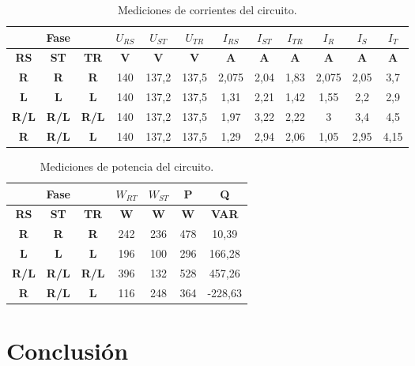 \documentclass[a4paper]{article}
\begin{document}
\begin{table}[H]
\centering
\begin{tabular}{|c|c|c|c|c|c|c|c|c|c|c|c|}
\hline
\multicolumn{3}{|c|}{\textbf{Fase}} & \textbf{$U_{RS}$} & \textbf{$U_{ST}$} & \textbf{$U_{TR}$} & \textbf{$I_{RS}$} & \textbf{$I_{ST}$} & \textbf{$I_{TR}$} & \textbf{$I_{R}$} & \textbf{$I_{S}$} & \textbf{$I_{T}$} \\ \hline
\textbf{RS} & \textbf{ST} & \textbf{TR} & \textbf{V} & \textbf{V} & \textbf{V} & \textbf{A} & \textbf{A} & \textbf{A} & \textbf{A} & \textbf{A} & \textbf{A} \\ \hline
\textbf{R} & \textbf{R} & \textbf{R} & 140 & 137,2 & 137,5 & 2,075 & 2,04 & 1,83 & 2,075 & 2,05 & 3,7 \\ \hline
\textbf{L} & \textbf{L} & \textbf{L} & 140 & 137,2 & 137,5 & 1,31 & 2,21 & 1,42 & 1,55 & 2,2 & 2,9 \\ \hline
\textbf{R/L} & \textbf{R/L} & \textbf{R/L} & 140 & 137,2 & 137,5 & 1,97 & 3,22 & 2,22 & 3 & 3,4 & 4,5 \\ \hline
\textbf{R} & \textbf{R/L} & \textbf{L} & 140 & 137,2 & 137,5 & 1,29 & 2,94 & 2,06 & 1,05 & 2,95 & 4,15 \\ \hline
\end{tabular}
\label{tabla:1}
\caption{Mediciones de corrientes del circuito.}
\end{table}

\begin{table}[H]
\centering
\begin{tabular}{|c|c|c|c|c|c|c|}
\hline
\multicolumn{3}{|c|}{\textbf{Fase}} & \textbf{$W_{RT}$} & \textbf{$W_{ST}$} & \textbf{P} & \textbf{Q} \\ \hline
\textbf{RS} & \textbf{ST} & \textbf{TR} & \textbf{W} & \textbf{W} & \textbf{W} & \textbf{VAR} \\ \hline
\textbf{R} & \textbf{R} & \textbf{R} & 242 & 236 & 478 & 10,39 \\ \hline
\textbf{L} & \textbf{L} & \textbf{L} & 196 & 100 & 296 & 166,28 \\ \hline
\textbf{R/L} & \textbf{R/L} & \textbf{R/L} & 396 & 132 & 528 & 457,26 \\ \hline
\textbf{R} & \textbf{R/L} & \textbf{L} & 116 & 248 & 364 & -228,63 \\ \hline
\end{tabular}
\label{tabla:2}
\caption{Mediciones de potencia del circuito.}
\end{table}



\section*{Conclusión}
\end{document}
